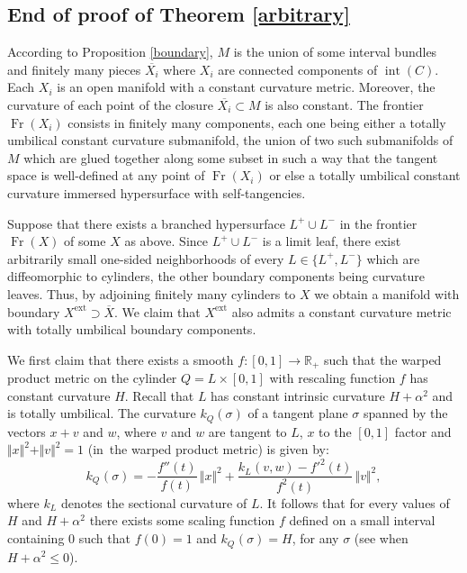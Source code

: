 \documentclass[JEP,XML,SOM,Unicode]{cedram}
\DeclareMathOperator{\Fr}{Fr}
\DeclareMathOperator{\inte}{int}
\let\parallel\Vert
\theoremstyle{definition}
\theoremstyle{remark}
\numberwithin{equation}{section}
\newcommand{\RR}{\mathbb R}
\begin{document}
\subsection{End of proof of Theorem \ref{arbitrary}}
According to Proposition \ref{boundary}, $M$ is the union of some interval bundles and finitely many pieces
$\overline{X_i}$ where $X_i$ are connected components of $\inte (C)$. Each $X_i$ is an open manifold with a constant curvature metric.
Moreover, the curvature of each point of the closure $\overline{X_i}\subset M$ is also constant. The frontier
$\Fr(X_i)$ consists in finitely many components, each one being either a totally umbilical constant curvature
submanifold, the union of two such submanifolds of $M$ which are glued together along some subset in such a way
that the tangent space is well-defined at any point of $\Fr(X_i)$ or else a
totally umbilical constant curvature immersed hypersurface with self-tangencies.

Suppose that there exists a branched hypersurface $L^+\cup L^-$ in the frontier $\Fr(X)$ of some $X$ as above.
Since $L^+\cup L^-$ is a limit leaf, there exist arbitrarily small one-sided neighborhoods
of every $L\in\{L^+,L^-\}$ which are diffeomorphic to cylinders, the other boundary components being curvature leaves.
Thus, by adjoining finitely many cylinders to $X$ we obtain a manifold with boundary $X^\mathrm{ext}\supset \overline{X}$.
We claim that $X^\mathrm{ext}$ also admits a constant curvature metric with totally umbilical boundary components.

We first claim that there exists a smooth $f:[0,1]\to \RR_+$ such that
the warped product metric on the cylinder $Q=L\times [0,1]$ with rescaling function $f$ has constant curvature $H$.
Recall that $L$ has constant intrinsic curvature $H+\alpha^2$ and is totally umbilical. The curvature $k_Q(\sigma)$ of a tangent plane
$\sigma$ spanned by the vectors $x+v$ and $w$, where $v$ and $w$ are tangent to $L$, $x$ to the $[0,1]$ factor and
$\parallel x\parallel^2+\parallel v\parallel^2=1$ (in~the warped product metric)
is given by:
\[ k_{Q^{}}(\sigma)=-\frac{f''(t)}{f(t)}\,\parallel x\parallel^2 + \frac{k_{L^{}}(v,w)-f'^2(t)}{f^2(t)}\,\parallel v\parallel^2,\]
where $k_L$ denotes the sectional curvature of $L$.
It follows that for every values of $H$ and $H+\alpha^2$ there exists some scaling function $f$ defined on a small interval
containing $0$ such that $f(0)=1$ and $ k_{Q^{}}(\sigma)=H$, for any $\sigma$ (see \eg \cite[Cor.\,7.10]{BO} when
$H+\alpha^2\leq 0$).
\end{document}
